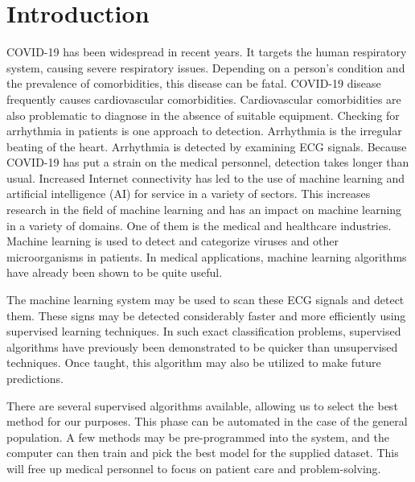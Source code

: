 \section{Introduction} \label{sec:introduction}

COVID-19 has been widespread in recent years. It targets the human respiratory system, causing severe respiratory issues. Depending on a person's condition and the prevalence of comorbidities, this disease can be fatal. {\responsemod COVID-19 disease frequently causes cardiovascular comorbidities.} Cardiovascular comorbidities are also problematic to diagnose in the absence of suitable equipment. Checking for arrhythmia in patients is one approach to detection. Arrhythmia is the irregular beating of the heart. Arrhythmia is detected by examining ECG signals. Because COVID-19 has put a strain on the medical personnel, detection takes longer than usual. Increased Internet connectivity has led to the use of machine learning and artificial intelligence (AI) for service in a variety of sectors. This increases research in the field of machine learning and has an impact on machine learning in a variety of domains. One of them is the medical and healthcare {\responsemod industries}. Machine learning is used to detect and categorize viruses and other microorganisms in patients. In medical applications, machine learning algorithms have already been shown to be quite useful.

The machine learning system may be used to scan these ECG signals and detect them. These signs may be detected considerably faster and more efficiently using supervised learning techniques. In such exact classification problems, supervised algorithms have previously been demonstrated to be quicker than unsupervised techniques. Once taught, this algorithm may also be utilized to make future predictions.

There are several supervised algorithms {\responsemod available}, allowing us to select the best method for our purposes. This phase can be automated in the case of the general population. A few methods may be pre-programmed into the system, and the computer can then train and pick the best model for the supplied dataset. This will free up medical personnel to focus on patient care and problem-solving.

